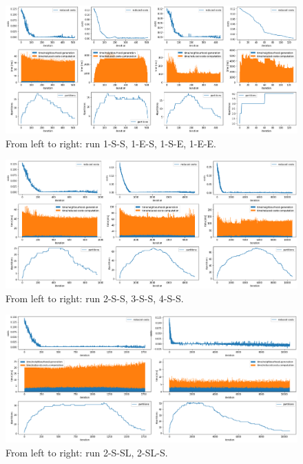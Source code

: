 \begin{landscape}
    \begin{figure}
        \includegraphics[width=25cm]{pics/experiments_1.png}
        \caption{From left to right: run 1-S-S, 1-E-S, 1-S-E, 1-E-E.}
        \label{fig:setting12}
    \end{figure}
\end{landscape}

\begin{landscape}
    \begin{figure}
        \includegraphics[width=25cm]{pics/experiments_2.png}
        \caption{From left to right: run 2-S-S, 3-S-S, 4-S-S.}
        \label{fig:setting2}
    \end{figure}
\end{landscape}

\begin{landscape}
    \begin{figure}
        \includegraphics[width=25cm]{pics/experiments_3.png}
        \caption{From left to right: run 2-S-SL, 2-SL-S.}
        \label{fig:setting3}
    \end{figure}
\end{landscape}

